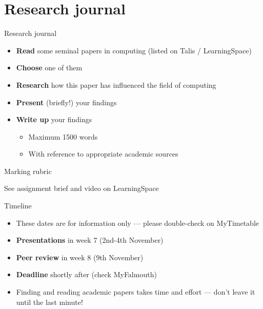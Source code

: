 \part{Research journal}
\frame{\partpage}

\begin{frame}{Research journal}
    \begin{itemize}
        \pause\item \textbf{Read} some seminal papers in computing (listed on Talis / LearningSpace)
        \pause\item \textbf{Choose} one of them
        \pause\item \textbf{Research} how this paper has influenced the field of computing
		\pause\item \textbf{Present} (briefly!) your findings
        \pause\item \textbf{Write up} your findings
        \begin{itemize}
            \pause\item Maximum 1500 words
            \pause\item With reference to appropriate academic sources
        \end{itemize}
    \end{itemize}
\end{frame}

\begin{frame}{Marking rubric}
    \begin{center}
        See assignment brief and video on LearningSpace
    \end{center}
\end{frame}

\begin{frame}{Timeline}
    \begin{itemize}
        \pause\item These dates are for information only --- please double-check on MyTimetable
        \pause\item \textbf{Presentations} in week 7 (2nd-4th November)
        \pause\item \textbf{Peer review} in week 8 (9th November)
        \pause\item \textbf{Deadline} shortly after (check MyFalmouth)
        \pause\item Finding and reading academic papers takes time and effort --- don't leave it until the last minute!
    \end{itemize}
\end{frame}

